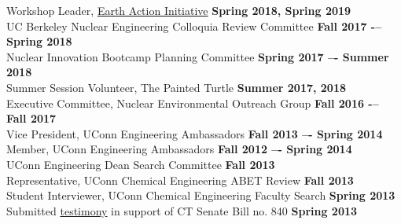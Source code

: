 \documentclass[margin,line]{resume}
\begin{document}
\begin{resume}
Workshop Leader, \href{https://www.earthactioninitiative.org/}{Earth Action Initiative}
    \hfill \textbf{Spring 2018, Spring 2019} \\
UC Berkeley Nuclear Engineering Colloquia Review Committee 
    \hfill \textbf{Fall 2017 -– Spring 2018} \\
Nuclear Innovation Bootcamp Planning Committee	
    \hfill \textbf{Spring 2017 –- Summer 2018} \\
Summer Session Volunteer, The Painted Turtle
    \hfill \textbf{Summer 2017, 2018} \\
Executive Committee, Nuclear Environmental Outreach Group
    \hfill \textbf{Fall 2016 -– Fall 2017} \\
Vice President, UConn Engineering Ambassadors
    \hfill \textbf{Fall 2013 –- Spring 2014} \\
Member, UConn Engineering Ambassadors
    \hfill \textbf{Fall 2012 –- Spring 2014} \\
UConn Engineering Dean Search Committee
    \hfill \textbf{Fall 2013} \\
Representative, UConn Chemical Engineering ABET Review
    \hfill \textbf{Fall 2013} \\
Student Interviewer, UConn Chemical Engineering Faculty Search
    \hfill \textbf{Spring 2013} \\
Submitted \href{https://www.cga.ct.gov/2013/FINdata/Tmy/2013SB-00840-R000304-Milos\%20Atz,\%20Student,\%20UConn-TMY.PDF}{testimony} in support of CT Senate Bill no. 840
    \hfill \textbf{Spring 2013} \\ %




\end{resume}
\end{document}
